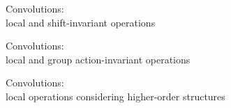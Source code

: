 \documentclass[landscape,a0paper,blockverticalspace = 5mm]{tikzposter}
\begin{document}
\begin{columns}
{{\begin{center}
\begin{minipage}{0.2\linewidth}
\begin{center}
        
          \end{center}
      \end{minipage} 
     
    \end{center}
\vspace{1cm}
\begin{center}
\begin{minipage}{0.2\linewidth}
\vspace{-1.5cm}
		\begin{center}
		Convolutions: 
		\\ local and shift-invariant operations 	 
	\end{center}		       
      
      \end{minipage}
      \begin{minipage}{0.1\linewidth}
      \vspace{-2cm}
         \begin{center}
         
		   
	\end{center}
      \end{minipage} 
	\begin{minipage}{0.2\linewidth}
	\vspace{-1.5cm}
         \begin{center}
		Convolutions: 
		\\ local and group action-invariant	operations
	\end{center}
      \end{minipage}
      \begin{minipage}{0.1\linewidth}
      \vspace{-2cm}
         \begin{center}
         
		   
	\end{center}
      \end{minipage} 
	\begin{minipage}{0.2\linewidth}
	\vspace{-1.5cm}
         \begin{center}
		Convolutions: 
		\\ local operations considering higher-order structures 	
	\end{center}
      \end{minipage}
       \end{center}


}}
\end{columns}
\end{document}
